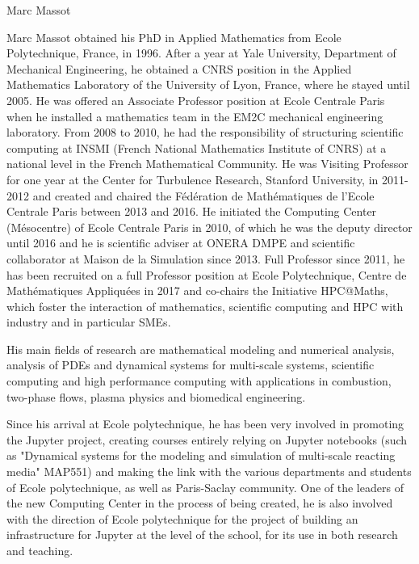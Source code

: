 \begin{participant}[type=R,PM=2,gender=male]{Marc Massot}

    Marc Massot obtained his PhD in Applied Mathematics from Ecole Polytechnique, 
    France, in 1996. After a
    year at Yale University, Department of Mechanical Engineering, he obtained a
    CNRS position in the Applied Mathematics Laboratory of the University of Lyon,
    France, where he stayed until 2005. He was offered an Associate Professor
    position at Ecole Centrale Paris when he installed a mathematics team in the
    EM2C mechanical engineering laboratory. From 2008 to 2010, he had the responsibility of 
    structuring scientific computing at INSMI (French National Mathematics Institute of CNRS) 
    at a national level in the French Mathematical Community. He was Visiting Professor 
    for one year at the Center for Turbulence Research, Stanford University, in 2011-2012 
    and created and chaired the Fédération de Mathématiques de l’Ecole Centrale Paris
    between 2013 and 2016. He initiated the Computing Center (Mésocentre) of Ecole
    Centrale Paris in 2010, of which he was the deputy director until 2016 and he
    is scientific adviser at ONERA DMPE and scientific collaborator at Maison de la
    Simulation since 2013. Full Professor since 2011, he has been recruited on a
    full Professor position at Ecole Polytechnique, Centre de Mathématiques
    Appliquées in 2017 and co-chairs the Initiative HPC@Maths, which foster the interaction of mathematics, 
    scientific computing and HPC with industry and in particular SMEs. 
    
    His main fields of
    research are mathematical modeling and numerical analysis, analysis of PDEs and
    dynamical systems for multi-scale systems, scientific computing and high
    performance computing with applications in combustion, two-phase flows, plasma
    physics and biomedical engineering. 
    
    Since his arrival at Ecole polytechnique, he has been very involved 
    in promoting the Jupyter project, creating courses entirely relying on 
    Jupyter notebooks (such as "Dynamical systems for the modeling and simulation 
    of multi-scale reacting media" MAP551) and making the link with the various departments
    and students of Ecole polytechnique, as well as Paris-Saclay community. 
    One of the leaders of the new Computing Center
    in the process of being created, he is also involved with the direction of Ecole polytechnique
    for the project of building an infrastructure for Jupyter at the level of the school, for its use in 
    both research and teaching.

\end{participant}